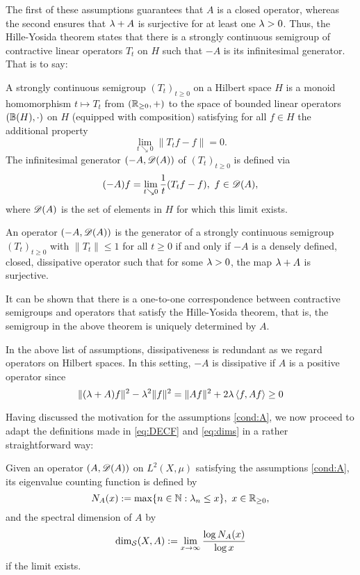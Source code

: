 The first of these assumptions guarantees that $A$ is a closed operator, whereas the second ensures that $\lambda+A$ is surjective for at least one $\lambda>0$. Thus, the Hille-Yosida theorem states that there is a strongly continuous semigroup of contractive linear operators $T_t$ on $H$ such that $-A$ is its infinitesimal generator. That is to say:
\begin{defin}\label{def:semigroup}
  A strongly continuous semigroup $(T_t)_{t\geq0}$ on a Hilbert space $H$ is a monoid homomorphism $t\mapsto T_t$ from $(\mathbb{R}_{\geq0},+)$ to the space of bounded linear operators $(\mathbb{B}(H),\cdot)$ on $H$ (equipped with composition) satisfying for all $f\in H$ the additional property
  \[
    \lim_{t\searrow0} \|T_tf-f\|=0.
  \]
  The infinitesimal generator $(-A,\mathscr{D}(A))$ of $(T_t)_{t\geq0}$ is defined via
  \[
    (-A)f=\lim_{t\searrow0}\frac{1}{t}(T_tf-f),\ f\in\scD(A),
  \]
  where $\mathscr{D}(A)$ is the set of elements in $H$ for which this limit exists.
\end{defin}
\begin{thm}\label{thm:HY}
  An operator $(-A,\mathscr{D}(A))$ is the generator of a strongly continuous semigroup $(T_t)_{t\geq0}$ with $\|T_t\|\leq1$ for all $t\geq0$ if and only if $-A$ is a densely defined, closed, dissipative operator such that for some $\lambda>0$, the map $\lambda+A$ is surjective. 
\end{thm}
It can be shown that there is a one-to-one correspondence between contractive semigroups and operators that satisfy the Hille-Yosida theorem, that is, the semigroup in the above theorem is uniquely determined by $A$. 

\begin{rem}
  In the above list of assumptions, dissipativeness is redundant as we regard operators on Hilbert spaces. In this setting, $-A$ is dissipative if $A$ is a positive operator since
  \[
    \|(\lambda+A)f\|^2-\lambda^2\|f\|^2=\|Af\|^2+2\lambda\left<f,Af\right>\geq0
  \]

\end{rem}


Having discussed the motivation for the assumptions \ref{cond:A}, we now proceed to adapt the definitions made in \eqref{eq:DECF} and \eqref{eq:dims} in a rather straightforward way:
\begin{defin}
  Given an operator $(A,\mathscr{D}(A))$ on $L^2(X,\mu)$ satisfying the assumptions \ref{cond:A}, its eigenvalue counting function is defined by
  \begin{equation}\label{eq:defXVCF}
    N_A(x):=\max\{n\in\mathbb{N}:\lambda_n\leq x\},\ x\in\mathbb{R}_{\geq0},
  \end{equation}
  and the spectral dimension of $A$ by
  \begin{equation}\label{eq:defdims}
    \dim_{\mathcal{S}}(X,A):=\lim_{x\to\infty}\frac{\log N_A(x)}{\log x}
  \end{equation}
  if the limit exists.
\end{defin}



